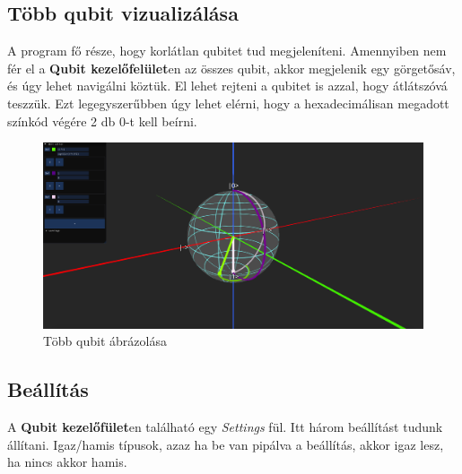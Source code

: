 \documentclass[fontsize=12pt,a4paper]{article}
\begin{document}
\newpage
\subsection{Több qubit vizualizálása}
A program fő része, hogy korlátlan qubitet tud megjeleníteni. Amennyiben nem fér el a \textbf{Qubit kezelőfelület}en az összes qubit, akkor megjelenik egy görgetősáv, és úgy lehet navigálni köztük. El lehet rejteni a qubitet is azzal, hogy átlátszóvá teszzük. Ezt legegyszerűbben úgy lehet elérni, hogy a hexadecimálisan megadott színkód végére 2 db 0-t kell beírni.

\begin{figure}[h]
    \centering
    \includegraphics[width=1.0\linewidth]{App/nqubit.png}
    \caption{Több qubit ábrázolása}
\end{figure}

\subsection{Beállítás}
A \textbf{Qubit kezelőfület}en található egy \textit{Settings} fül. Itt három beállítást tudunk állítani. Igaz/hamis típusok, azaz ha be van pipálva a beállítás, akkor igaz lesz, ha nincs akkor hamis.

\begin{table}[h]
    \centering
    \vspace{-\arrayrulewidth} %
\end{table}
\end{document}
